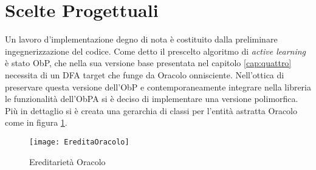  


\section{Scelte Progettuali}
Un lavoro d'implementazione degno di nota è costituito dalla preliminare ingegnerizzazione del codice. Come detto il prescelto algoritmo di \textit{active learning} è stato \ac{ObP}, che nella sua versione base presentata nel capitolo \ref{cap:quattro} necessita di un \ac{DFA} target che funge da Oracolo onnisciente. Nell'ottica di preservare questa versione dell'\ac{ObP} e contemporaneamente integrare nella libreria le funzionalità dell'\ac{ObPA} si è deciso di implementare una versione polimorfica. Più in dettaglio si è creata una gerarchia di classi per l'entità astratta Oracolo come in figura \ref{fig:eor}.
\begin{figure}[htp]
	\centering
	\texttt{[image: EreditaOracolo]}
	\caption[Ereditarietà Oracolo]{Ereditarietà Oracolo}
   \label{fig:eor}
\end{figure}

